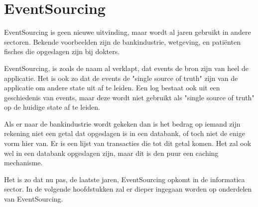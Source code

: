 
\chapter{EventSourcing}
\label{ch:eventsourcing}

EventSourcing is geen nieuwe uitvinding, maar wordt al jaren gebruikt in andere sectoren. Bekende voorbeelden zijn de bankindustrie, wetgeving, en patiënten fisches die opgeslagen zijn bij dokters.

EventSourcing, is zoals de naam al verklapt, dat events de bron zijn van heel de applicatie. Het is ook zo dat de events de "single source of truth" zijn van de applicatie om andere state uit af te leiden. Een log bestaat ook uit een geschiedenis van events, maar deze wordt niet gebruikt als "single source of truth" op de huidige state af te leiden.

Als er naar de bankindustrie wordt gekeken dan is het bedrag op iemand zijn rekening niet een getal dat opgeslagen is in een databank, of toch niet de enige vorm hier van. Er is een lijst van transacties die tot dit getal komen. Het zal ook wel in een databank opgeslagen zijn, maar dit is den puur een caching mechanisme.

Het is zo dat nu pas, de laatste jaren, EventSourcing opkomt in de informatica sector. In de volgende hoofdstukken zal er dieper ingegaan worden op onderdelen van EventSourcing.